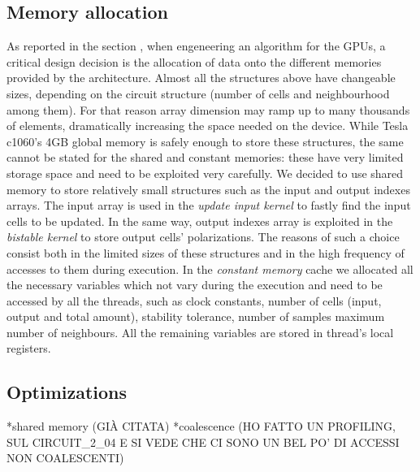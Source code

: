 \subsection{Memory allocation}
As reported in the section \refname{\label{sec:art_of_cuda}}, when engeneering an algorithm for the GPUs, a critical
design decision is the allocation of data onto the different memories provided by the architecture.
Almost all the structures above have changeable sizes, depending on the circuit structure (number of cells and neighbourhood among them).
For that reason array dimension may ramp up to many thousands of elements, dramatically increasing the space needed on the device.
While Tesla c1060's 4GB global memory is safely enough to store these structures, the same cannot be stated for the shared and constant
memories: these have very limited storage space and need to be exploited very carefully.
We decided to use shared memory to store relatively small structures such as the input and output indexes arrays. The input array is used
in the \textit{update input kernel} to fastly find the input cells to be updated. In the same way, output indexes array is exploited 
in the \textit{bistable kernel} to store output cells' polarizations.\newline
The reasons of such a choice consist both in the limited sizes of these structures and in the high frequency of accesses to them during
execution.\newline
In the \textit{constant memory} cache we allocated all the necessary variables which not vary during the execution and need to be accessed
by all the threads, such as clock constants, number of cells (input, output and total amount), stability tolerance, number of samples 
 maximum number of neighbours. All the remaining variables are stored in thread's local registers.\newline

\subsection{Optimizations}
*shared memory (GIÀ CITATA)
*coalescence (HO FATTO UN PROFILING, SUL CIRCUIT_2_04 E SI VEDE CHE CI SONO UN BEL PO' DI ACCESSI NON COALESCENTI)










